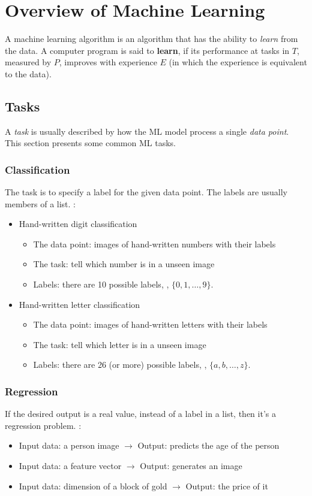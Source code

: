 \chapter{Overview of Machine Learning}
\label{cha:overview-ml}

A machine learning algorithm is an algorithm that has the ability to \textit{learn} from the data. A computer program is said to \textbf{learn}, if its performance at tasks in $T$, measured by $P$, improves with experience $E$ (in which the experience is equivalent to the data). \cite{goodfellow2016deep}

\section{Tasks}
A \textit{task} is usually described by how the \ac{ML} model process a single \textit{data point}. This section presents some common \ac{ML} tasks. \cite{vu2018mlcb}

\subsection{Classification}
The task is to specify a label for the given data point. The labels are usually members of a list. \Eg:
\begin{itemize}
	\item Hand-written digit classification
	\begin{itemize}
		\item The data point: images of hand-written numbers with their labels
		\item The task: tell which number is in a unseen image
		\item Labels: there are 10 possible labels, \ie, $\{0, 1, \dots, 9\}$.
	\end{itemize}
	\item Hand-written letter classification
	\begin{itemize}
		\item The data point: images of hand-written letters with their labels
		\item The task: tell which letter is in a unseen image
		\item Labels: there are 26 (or more) possible labels, \ie, $\{a, b, \dots, z\}$.
	\end{itemize}
\end{itemize}

\subsection{Regression}
If the desired output is a real value, instead of a label in a list, then it's a regression problem. \Eg:
\begin{itemize}
	\item Input data: a person image $\longrightarrow$ Output: predicts the age of the person
	\item Input data: a feature vector $\longrightarrow$ Output: generates an image
	\item Input data: dimension of a block of gold $\longrightarrow$ Output: the price of it
\end{itemize}

